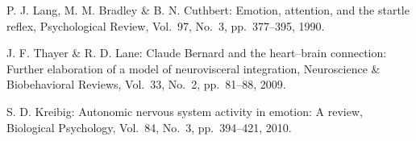 \documentclass[a4paper]{jarticle}
\begin{document}
\begin{thebibliography}{12}
P. J. Lang, M. M. Bradley \& B. N. Cuthbert: 
Emotion, attention, and the startle reflex,
Psychological Review, Vol.~97, No.~3, pp.~377--395, 1990.

J. F. Thayer \& R. D. Lane: 
Claude Bernard and the heart–brain connection: Further elaboration of a model of neurovisceral integration,
Neuroscience \& Biobehavioral Reviews, Vol.~33, No.~2, pp.~81--88, 2009.

S. D. Kreibig: 
Autonomic nervous system activity in emotion: A review,
Biological Psychology, Vol.~84, No.~3, pp.~394--421, 2010.

\end{thebibliography}
\end{document}
